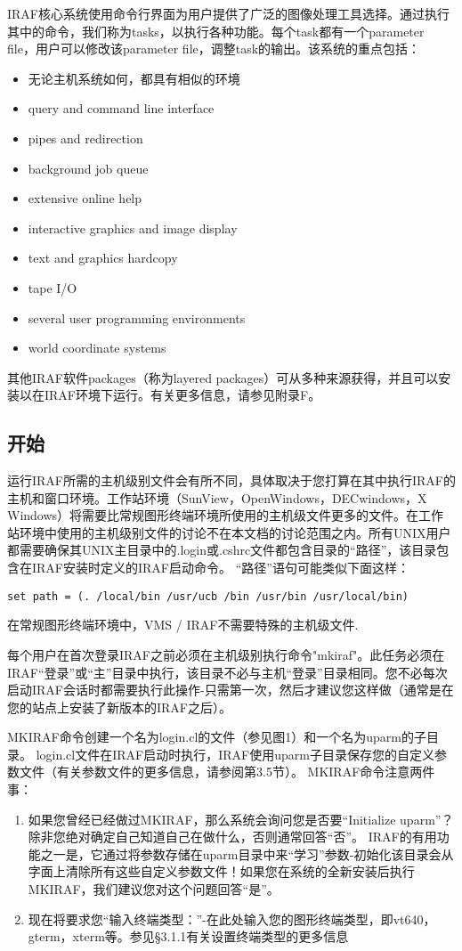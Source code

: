 \documentclass[CJK, utf8, GBK, oneside, a4paper, 12pt]{ctexart}
\begin{document}
IRAF核心系统使用命令行界面为用户提供了广泛的图像处理工具选择。通过执行其中的命令，我们称为tasks，以执行各种功能。每个task都有一个parameter file，用户可以修改该parameter file，调整task的输出。该系统的重点包括：
\begin{itemize}
	\item 无论主机系统如何，都具有相似的环境
	\item query and command line interface
	\item pipes and redirection
	\item background job queue
	\item extensive online help
	\item interactive graphics and image display
	\item text and graphics hardcopy
	\item tape I/O
	\item several user programming environments
	\item world coordinate systems
\end{itemize}

其他IRAF软件packages（称为layered packages）可从多种来源获得，并且可以安装以在IRAF环境下运行。有关更多信息，请参见附录F。

\subsection{开始}
运行IRAF所需的主机级别文件会有所不同，具体取决于您打算在其中执行IRAF的主机和窗口环境。工作站环境（SunView，OpenWindows，DECwindows，X Windows）将需要比常规图形终端环境所使用的主机级文件更多的文件。在工作站环境中使用的主机级别文件的讨论不在本文档的讨论范围之内。所有UNIX用户都需要确保其UNIX主目录中的.login或.cshrc文件都包含目录的“路径”，该目录包含在IRAF安装时定义的IRAF启动命令。 “路径”语句可能类似下面这样：

\begin{lstlisting}
set path = (. /local/bin /usr/ucb /bin /usr/bin /usr/local/bin)
\end{lstlisting}

在常规图形终端环境中，VMS / IRAF不需要特殊的主机级文件.

每个用户在首次登录IRAF之前必须在主机级别执行命令"mkiraf"。此任务必须在IRAF“登录”或“主”目录中执行，该目录不必与主机“登录”目录相同。您不必每次启动IRAF会话时都需要执行此操作-只需第一次，然后才建议您这样做（通常是在您的站点上安装了新版本的IRAF之后）。

MKIRAF命令创建一个名为login.cl的文件（参见图1）和一个名为uparm的子目录。 login.cl文件在IRAF启动时执行，IRAF使用uparm子目录保存您的自定义参数文件（有关参数文件的更多信息，请参阅第3.5节）。 MKIRAF命令注意两件事：
\begin{enumerate}
	\item  如果您曾经已经做过MKIRAF，那么系统会询问您是否要“Initialize uparm”？除非您绝对确定自己知道自己在做什么，否则通常回答“否”。 IRAF的有用功能之一是，它通过将参数存储在uparm目录中来“学习”参数-初始化该目录会从字面上清除所有这些自定义参数文件！如果您在系统的全新安装后执行MKIRAF，我们建议您对这个问题回答“是”。
	\item 现在将要求您“输入终端类型：”-在此处输入您的图形终端类型，即vt640，gterm，xterm等。参见§3.1.1有关设置终端类型的更多信息
\end{enumerate}
\end{document}
